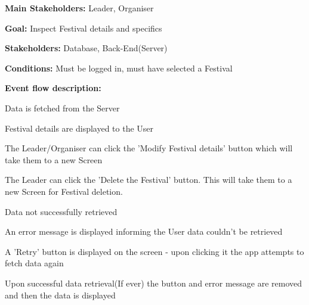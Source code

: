 				\noindent {}
				\begin{packed_item}
					\item \textbf{Main Stakeholders:} Leader, Organiser
					\item \textbf{Goal:} Inspect Festival details and specifics
					\item \textbf{Stakeholders: } Database, Back-End(Server)
					\item \textbf{Conditions: } Must be logged in, must have selected a Festival
					\item \textbf{Event flow description: }
					\begin{packed_enum}
						\item Data is fetched from the Server
						\item Festival details are displayed to the User
						\item The Leader/Organiser can click the 'Modify Festival details' button which will take them to a new Screen
						\item The Leader can click the 'Delete the Festival' button. This will take them to a new Screen for Festival deletion.
					\end{packed_enum}
				
					\begin{packed_item}
						\item[1.a] Data not successfully retrieved
						\item[] \begin{packed_enum}
							\item An error message is displayed informing the User data couldn't be retrieved
							\item A 'Retry' button is displayed on the screen - upon clicking it the app attempts to fetch data again
							\item Upon successful data retrieval(If ever) the button and error message are removed and then the data is displayed
						\end{packed_enum}
					\end{packed_item}
				\end{packed_item}

